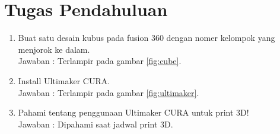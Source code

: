 \section*{Tugas Pendahuluan}
\begin{enumerate}
  \item Buat satu desain kubus pada fusion 360 dengan nomer kelompok yang menjorok ke dalam. \\
  Jawaban : Terlampir pada gambar \ref{fig:cube}.
  \item Install Ultimaker CURA. \\
  Jawaban : Terlampir pada gambar \ref*{fig:ultimaker}.
  \item Pahami tentang penggunaan Ultimaker CURA untuk print 3D! \\
  Jawaban : Dipahami saat jadwal print 3D.
\end{enumerate}